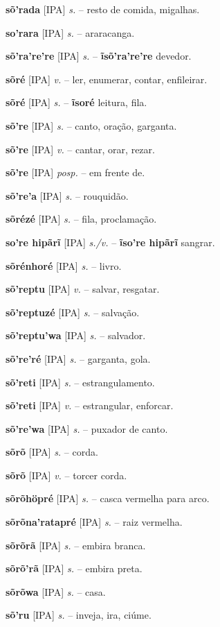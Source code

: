 \textbf{sõ'rada} [IPA] \textit{s.} -- resto de comida, migalhas.

\textbf{so'rara} [IPA] \textit{s.} -- araracanga.

\textbf{sõ'ra're're} [IPA] \textit{s.} -- \textbf{ĩsõ'ra're're} devedor.

\textbf{sõré} [IPA] \textit{v.} -- ler, enumerar, contar, enfileirar.

\textbf{sõré} [IPA] \textit{s.} -- \textbf{ĩsoré} leitura, fila.

\textbf{sõ're} [IPA] \textit{s.} -- canto, oração, garganta.

\textbf{sõ're} [IPA] \textit{v.} -- cantar, orar, rezar.

\textbf{sõ're} [IPA] \textit{posp.} -- em frente de.

\textbf{sõ're'a} [IPA] \textit{s.} -- rouquidão.

\textbf{sõrézé} [IPA] \textit{s.} -- fila, proclamação.

\textbf{so're hipãrĩ} [IPA] \textit{s./v.} -- \textbf{ĩso're hipãrĩ} sangrar.

\textbf{sõrénhoré} [IPA] \textit{s.} -- livro.

\textbf{sõ'reptu} [IPA] \textit{v.} -- salvar, resgatar.

\textbf{sõ'reptuzé} [IPA] \textit{s.} -- salvação.

\textbf{sõ'reptu'wa} [IPA] \textit{s.} -- salvador.

\textbf{sõ're'ré} [IPA] \textit{s.} -- garganta, gola.

\textbf{sõ'reti} [IPA] \textit{s.} -- estrangulamento.

\textbf{sõ'reti} [IPA] \textit{v.} -- estrangular, enforcar.

\textbf{sõ're'wa} [IPA] \textit{s.} -- puxador de canto.

\textbf{sõrõ} [IPA] \textit{s.} -- corda.

\textbf{sõrõ} [IPA] \textit{v.} -- torcer corda.

\textbf{sõrõhöpré} [IPA] \textit{s.} --  casca vermelha para arco.

\textbf{sõrõna'ratapré} [IPA] \textit{s.} -- raiz vermelha.

\textbf{sõrõrã} [IPA] \textit{s.} -- embira branca.

\textbf{sõrõ'rã} [IPA] \textit{s.} -- embira preta.

\textbf{sõrõwa} [IPA] \textit{s.} -- casa.

\textbf{sõ'ru} [IPA] \textit{s.} -- inveja, ira, ciúme.

